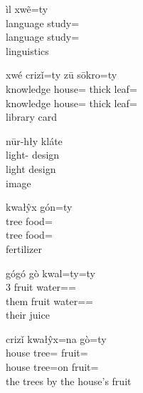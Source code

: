 \documentclass[12pt]{article}
\begin{document}
    \begin{exe}
        \ex
        \glll
        ìl xwẽ=ty \\
        language study=\Poss{} \\
        language study=\Poss{} \\
        \glt
        linguistics
    \end{exe}

    \begin{exe}
        \ex
        \glll
        xwé crizǐ=ty zū sōkro=ty \\
        knowledge house=\Poss{} thick leaf=\Poss{} \\
        knowledge house=\Poss{} thick leaf=\Poss{} \\
        \glt
        library card
    \end{exe}

    \begin{exe}
        \ex
        \glll
        nūr-hły kláte \\
        light-\Adj{} design \\
        light design \\
        \glt
        [digital] image
    \end{exe}

    \begin{exe}
        \ex
        \glll
        kwałŷx gón=ty  \\
        tree food=\Poss{} \\
        tree food=\Poss{} \\
        \glt
        fertilizer
    \end{exe}

    \begin{exe}
        \ex
        \glll
        gógó gò kwal=ty=ty \\
        3\Pl{} fruit water=\Poss{}=\Poss{} \\
        them fruit water=\Poss{}=\Poss{} \\
        \glt
        their juice
    \end{exe}

    \begin{exe}
        \ex
        \glll
        crizǐ kwałŷx=na gò=ty \\
        house tree=\AdessTwo{} fruit=\Poss{} \\
        house tree=on fruit=\Poss{} \\
        \glt
        the trees by the house's fruit
    \end{exe}
\end{document}
